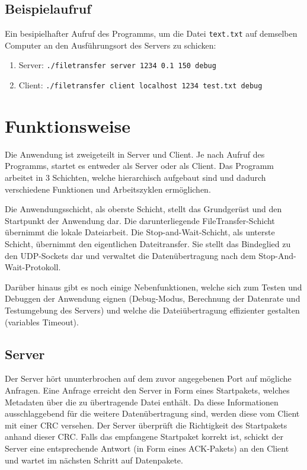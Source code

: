 \documentclass{article}
\begin{document}
		\subsection{Beispielaufruf}
		Ein besipielhafter Aufruf des Programms, um die Datei \texttt{text.txt} auf demselben Computer an den Ausführungsort des Servers zu schicken:

		\begin{enumerate}
			\item Server: \texttt{./filetransfer server 1234 0.1 150 debug}
			\item Client: \texttt{./filetransfer client localhost 1234 test.txt debug}
		\end{enumerate}

	\section{Funktionsweise}
	Die Anwendung ist zweigeteilt in Server und Client. Je nach Aufruf des Programms, startet es entweder als Server oder als Client. Das Programm arbeitet in 3 Schichten, welche hierarchisch aufgebaut sind und dadurch verschiedene Funktionen und Arbeitszyklen ermöglichen.

	Die Anwendungsschicht, als oberste Schicht, stellt das Grundgerüst und den Startpunkt der Anwendung dar. Die darunterliegende FileTransfer-Schicht übernimmt die lokale Dateiarbeit. Die Stop-and-Wait-Schicht, als unterste Schicht, übernimmt den eigentlichen Dateitransfer. Sie stellt das Bindeglied zu den UDP-Sockets dar und verwaltet die Datenübertragung nach dem Stop-And-Wait-Protokoll.


	Darüber hinaus gibt es noch einige Nebenfunktionen, welche sich zum Testen und Debuggen der Anwendung eignen (Debug-Modus, Berechnung der Datenrate und Testumgebung des Servers) und welche die Dateiübertragung effizienter gestalten (variables Timeout). 

		\subsection{Server}
		Der Server hört ununterbrochen auf dem zuvor angegebenen Port auf mögliche Anfragen. Eine Anfrage erreicht den Server in Form eines Startpakets, welches Metadaten über die zu übertragende Datei enthält. Da diese Informationen ausschlaggebend für die weitere Datenübertragung sind, werden diese vom Client mit einer CRC versehen. Der Server überprüft die Richtigkeit des Startpakets anhand dieser CRC. Falls das empfangene Startpaket korrekt ist, schickt der Server eine entsprechende Antwort (in Form eines ACK-Pakets) an den Client und wartet im nächsten Schritt auf Datenpakete.
\end{document}
